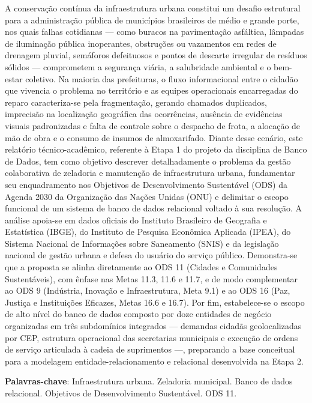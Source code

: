 \begin{resumo}
\begin{SingleSpacing}
A conservação contínua da infraestrutura urbana constitui um desafio estrutural para a administração pública de municípios brasileiros de médio e grande porte, nos quais falhas cotidianas --- como buracos na pavimentação asfáltica, lâmpadas de iluminação pública inoperantes, obstruções ou vazamentos em redes de drenagem pluvial, semáforos defeituosos e pontos de descarte irregular de resíduos sólidos --- comprometem a segurança viária, a salubridade ambiental e o bem-estar coletivo. Na maioria das prefeituras, o fluxo informacional entre o cidadão que vivencia o problema no território e as equipes operacionais encarregadas do reparo caracteriza-se pela fragmentação, gerando chamados duplicados, imprecisão na localização geográfica das ocorrências, ausência de evidências visuais padronizadas e falta de controle sobre o despacho de frota, a alocação de mão de obra e o consumo de insumos de almoxarifado. Diante desse cenário, este relatório técnico-acadêmico, referente à Etapa 1 do projeto da disciplina de Banco de Dados, tem como objetivo descrever detalhadamente o problema da gestão colaborativa de zeladoria e manutenção de infraestrutura urbana, fundamentar seu enquadramento nos Objetivos de Desenvolvimento Sustentável (ODS) da Agenda 2030 da Organização das Nações Unidas (ONU) e delimitar o escopo funcional de um sistema de banco de dados relacional voltado à sua resolução. A análise apoia-se em dados oficiais do Instituto Brasileiro de Geografia e Estatística (IBGE), do Instituto de Pesquisa Econômica Aplicada (IPEA), do Sistema Nacional de Informações sobre Saneamento (SNIS) e da legislação nacional de gestão urbana e defesa do usuário do serviço público. Demonstra-se que a proposta se alinha diretamente ao ODS 11 (Cidades e Comunidades Sustentáveis), com ênfase nas Metas 11.3, 11.6 e 11.7, e de modo complementar ao ODS 9 (Indústria, Inovação e Infraestrutura, Meta 9.1) e ao ODS 16 (Paz, Justiça e Instituições Eficazes, Metas 16.6 e 16.7). Por fim, estabelece-se o escopo de alto nível do banco de dados composto por doze entidades de negócio organizadas em três subdomínios integrados --- demandas cidadãs geolocalizadas por CEP, estrutura operacional das secretarias municipais e execução de ordens de serviço articulada à cadeia de suprimentos ---, preparando a base conceitual para a modelagem entidade-relacionamento e relacional desenvolvida na Etapa 2.

\vspace{\onelineskip}
\noindent
\textbf{Palavras-chave}: Infraestrutura urbana. Zeladoria municipal. Banco de dados relacional. Objetivos de Desenvolvimento Sustentável. ODS 11.
\end{SingleSpacing}
\end{resumo}
